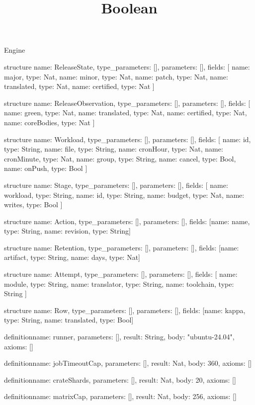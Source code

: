 \begin{lexlean}{Engine}
\title{Boolean}
\begin{semanticmodule}
structure{
  name: ReleaseState,
  type_parameters: [],
  parameters: [],
  fields: [
    {name: major, type: Nat},
    {name: minor, type: Nat},
    {name: patch, type: Nat},
    {name: translated, type: Nat},
    {name: certified, type: Nat}
  ]
}

structure{
  name: ReleaseObservation,
  type_parameters: [],
  parameters: [],
  fields: [
    {name: green, type: Nat},
    {name: translated, type: Nat},
    {name: certified, type: Nat},
    {name: coreBodies, type: Nat}
  ]
}

structure{
  name: Workload,
  type_parameters: [],
  parameters: [],
  fields: [
    {name: id, type: String},
    {name: file, type: String},
    {name: cronHour, type: Nat},
    {name: cronMinute, type: Nat},
    {name: group, type: String},
    {name: cancel, type: Bool},
    {name: onPush, type: Bool}
  ]
}

structure{
  name: Stage,
  type_parameters: [],
  parameters: [],
  fields: [
    {name: workload, type: String},
    {name: id, type: String},
    {name: budget, type: Nat},
    {name: writes, type: Bool}
  ]
}

structure{
  name: Action,
  type_parameters: [],
  parameters: [],
  fields: [{name: name, type: String}, {name: revision, type: String}]
}

structure{
  name: Retention,
  type_parameters: [],
  parameters: [],
  fields: [{name: artifact, type: String}, {name: days, type: Nat}]
}

structure{
  name: Attempt,
  type_parameters: [],
  parameters: [],
  fields: [
    {name: module, type: String},
    {name: translator, type: String},
    {name: toolchain, type: String}
  ]
}

structure{
  name: Row,
  type_parameters: [],
  parameters: [],
  fields: [{name: kappa, type: String}, {name: translated, type: Bool}]
}

definition{name: runner, parameters: [], result: String, body: "ubuntu-24.04", axioms: []}

definition{name: jobTimeoutCap, parameters: [], result: Nat, body: 360, axioms: []}

definition{name: crateShards, parameters: [], result: Nat, body: 20, axioms: []}

definition{name: matrixCap, parameters: [], result: Nat, body: 256, axioms: []}


\end{semanticmodule}
\end{lexlean}

